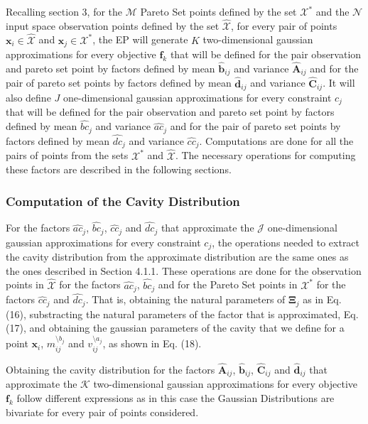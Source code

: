 Recalling section 3, for the $\mathcal{M}$ Pareto Set points defined by the set $\mathcal{X}^*$ and the $\mathcal{N}$ input space observation points defined by the set $\hat{\mathcal{X}}$, for every pair of points $\boldsymbol{x}_i \in \hat{\mathcal{X}}$ and $\boldsymbol{x}_j \in \mathcal{X}^*$, the EP will generate $K$ two-dimensional gaussian approximations for every objective $\boldsymbol{f}_k$ that will be defined for the pair observation and pareto set point by factors defined by mean $\hat{\boldsymbol{b}}_{ij}$ and variance $\hat{\boldsymbol{A}}_{ij}$ and for the pair of pareto set points by factors defined by mean $\hat{\boldsymbol{d}}_{ij}$ and variance $\hat{\boldsymbol{C}}_{ij}$. It will also define $J$ one-dimensional gaussian approximations for every constraint $c_j$ that will be defined for the pair observation and pareto set point by factors defined by mean $\hat{bc}_j$ and variance $\hat{ac}_j$ and for the pair of pareto set points by factors defined by mean $\hat{dc}_j$ and variance $\hat{cc}_j$. Computations are done for all the pairs of points from the sets $\mathcal{X}^*$ and $\hat{\mathcal{X}}$. The necessary operations for computing these factors are described in the following sections.

\subsubsection{Computation of the Cavity Distribution}
For the factors $\hat{ac}_j$, $\hat{bc}_j$, $\hat{cc}_j$ and $\hat{dc}_j$ that approximate the $\mathcal{J}$ one-dimensional gaussian approximations for every constraint $c_j$, the operations needed to extract the cavity distribution from the approximate distribution are the same ones as the ones described in Section 4.1.1. These operations are done for the observation points in $\hat{\mathcal{X}}$ for the factors $\hat{ac}_j$, $\hat{bc}_j$ and for the Pareto Set points in $\mathcal{X}^*$ for the factors $\hat{cc}_j$ and $\hat{dc}_j$. That is, obtaining the natural parameters of $\boldsymbol{\Xi}_j$ as in Eq. (16), substracting the natural parameters of the factor that is approximated, Eq. (17), and obtaining the gaussian parameters of the cavity that we define for a point $\boldsymbol{x}_i$, $m_{ij}^{\setminus b_j}$ and $v_{ij}^{\setminus a_j}$, as shown in Eq. (18).

Obtaining the cavity distribution for the factors $\hat{\boldsymbol{A}}_{ij}$, $\hat{\boldsymbol{b}}_{ij}$, $\hat{\boldsymbol{C}}_{ij}$ and $\hat{\boldsymbol{d}}_{ij}$ that approximate the $\mathcal{K}$ two-dimensional gaussian approximations for every objective $\boldsymbol{f}_k$ follow different expressions as in this case the Gaussian Distributions are bivariate for every pair of points considered.

